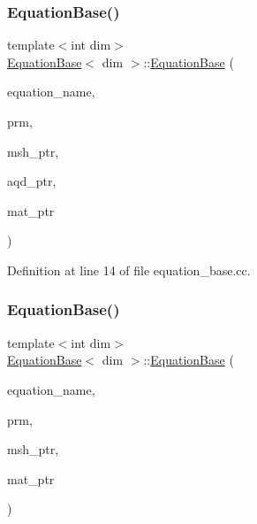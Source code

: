 \subsubsection{\texorpdfstring{Equation\+Base()}{EquationBase()}\hspace{0.1cm}{\footnotesize\ttfamily [1/2]}}
{\footnotesize\ttfamily template$<$int dim$>$ \\
\hyperlink{class_equation_base}{Equation\+Base}$<$ dim $>$\+::\hyperlink{class_equation_base}{Equation\+Base} (\begin{DoxyParamCaption}\item[{std\+::string}]{equation\+\_\+name,  }\item[{const Parameter\+Handler \&}]{prm,  }\item[{const std\+\_\+cxx11\+::shared\+\_\+ptr$<$ \hyperlink{class_mesh_generator}{Mesh\+Generator}$<$ dim $>$ $>$}]{msh\+\_\+ptr,  }\item[{const std\+\_\+cxx11\+::shared\+\_\+ptr$<$ \hyperlink{class_a_q_base}{A\+Q\+Base}$<$ dim $>$ $>$}]{aqd\+\_\+ptr,  }\item[{const std\+\_\+cxx11\+::shared\+\_\+ptr$<$ \hyperlink{class_material_properties}{Material\+Properties} $>$}]{mat\+\_\+ptr }\end{DoxyParamCaption})}



Definition at line 14 of file equation\+\_\+base.\+cc.

\mbox{\label{class_equation_base_a5e3fdb508c7aa186117ae81883ef1c59}} 
\subsubsection{\texorpdfstring{Equation\+Base()}{EquationBase()}\hspace{0.1cm}{\footnotesize\ttfamily [2/2]}}
{\footnotesize\ttfamily template$<$int dim$>$ \\
\hyperlink{class_equation_base}{Equation\+Base}$<$ dim $>$\+::\hyperlink{class_equation_base}{Equation\+Base} (\begin{DoxyParamCaption}\item[{std\+::string}]{equation\+\_\+name,  }\item[{const Parameter\+Handler \&}]{prm,  }\item[{const std\+\_\+cxx11\+::shared\+\_\+ptr$<$ \hyperlink{class_mesh_generator}{Mesh\+Generator}$<$ dim $>$ $>$}]{msh\+\_\+ptr,  }\item[{const std\+\_\+cxx11\+::shared\+\_\+ptr$<$ \hyperlink{class_material_properties}{Material\+Properties} $>$}]{mat\+\_\+ptr }\end{DoxyParamCaption})}

